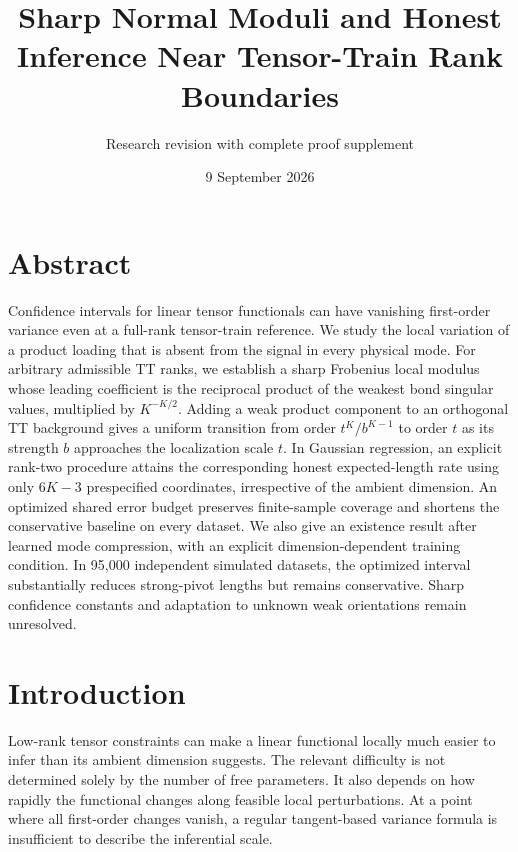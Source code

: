 \documentclass[
  11pt,
]{article}
\title{Sharp Normal Moduli and Honest Inference Near Tensor-Train Rank
Boundaries}
\subtitle{Research revision with complete proof supplement}
\author{}
\date{9 September 2026}
\begin{document}
\maketitle

{
\setcounter{tocdepth}{2}
\tableofcontents
}
\section*{Abstract}\label{abstract}

Confidence intervals for linear tensor functionals can have vanishing
first-order variance even at a full-rank tensor-train reference. We
study the local variation of a product loading that is absent from the
signal in every physical mode. For arbitrary admissible TT ranks, we
establish a sharp Frobenius local modulus whose leading coefficient is
the reciprocal product of the weakest bond singular values, multiplied
by \(K^{-K/2}\). Adding a weak product component to an orthogonal TT
background gives a uniform transition from order \(t^K/b^{K-1}\) to
order \(t\) as its strength \(b\) approaches the localization scale
\(t\). In Gaussian regression, an explicit rank-two procedure attains
the corresponding honest expected-length rate using only \(6K-3\)
prespecified coordinates, irrespective of the ambient dimension. An
optimized shared error budget preserves finite-sample coverage and
shortens the conservative baseline on every dataset. We also give an
existence result after learned mode compression, with an explicit
dimension-dependent training condition. In 95,000 independent simulated
datasets, the optimized interval substantially reduces strong-pivot
lengths but remains conservative. Sharp confidence constants and
adaptation to unknown weak orientations remain unresolved.

\section{Introduction}\label{introduction}

Low-rank tensor constraints can make a linear functional locally much
easier to infer than its ambient dimension suggests. The relevant
difficulty is not determined solely by the number of free parameters. It
also depends on how rapidly the functional changes along feasible local
perturbations. At a point where all first-order changes vanish, a
regular tangent-based variance formula is insufficient to describe the
inferential scale.
\end{document}
